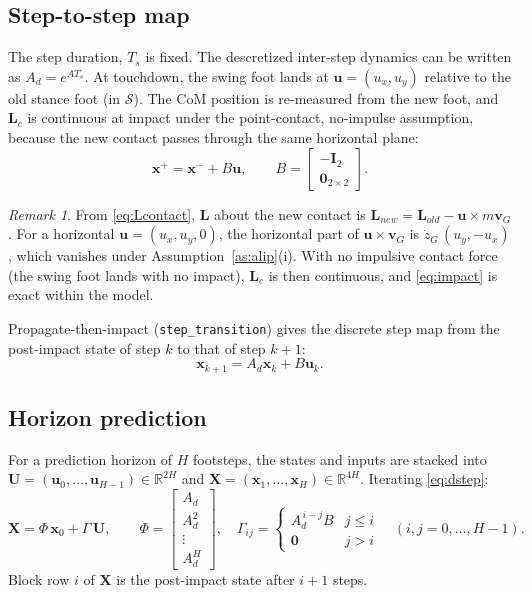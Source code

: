 \documentclass[11pt]{article}
\theoremstyle{remark}
\newtheorem{remark}{Remark}
\theoremstyle{definition}
\newcommand{\R}{\mathbb{R}}
\newcommand{\x}{\bm{x}}
\newcommand{\uu}{\bm{u}}
\newcommand{\bU}{\bm{U}}
\newcommand{\I}{\bm{I}}
\newcommand{\zero}{\bm{0}}
\newcommand{\code}[1]{\texttt{#1}}
\begin{document}
\subsection{Step-to-step map}
The step duration, $T_s$ is fixed. The descretized inter-step dynamics can be written as $A_d=e^{AT_s}$.
At touchdown, the swing foot lands at $\uu=(u_x,u_y)$ relative to the old stance foot (in $\mathcal S$).
The CoM position is re-measured from the new foot, and $\bm L_c$ is continuous at impact
under the point-contact, no-impulse assumption, because the new contact passes through the
same horizontal plane:
\begin{equation}
  \x^+=\x^-+B\uu,\qquad B=\begin{bmatrix}-\I_2\\ \zero_{2\times2}\end{bmatrix}.
  \label{eq:impact}
\end{equation}
\begin{remark}
From \eqref{eq:Lcontact}, $\bm L$ about the new contact is $\bm L_{new}=\bm L_{old}-\bm u\times m\bm v_G$. For a horizontal
$\bm u=(u_x,u_y,0)$, the horizontal part of $\bm u\times\bm v_G$ is $\dot z_G\,(u_y,-u_x)$, which vanishes under
Assumption~\ref{as:alip}(i). With no impulsive contact force (the swing foot lands with no impact), $\bm L_c$ is
then continuous, and \eqref{eq:impact} is exact within the model.
\end{remark}
Propagate-then-impact (\code{step\_transition}) gives the discrete step map from the
post-impact state of step $k$ to that of step $k+1$:
\begin{equation}
  \x_{k+1}=A_d\x_k+B\uu_k.
  \label{eq:dstep}
\end{equation}

\subsection{Horizon prediction}
For a prediction horizon of $H$ footsteps, the states and inputs are stacked into 
$\bU=(\uu_0,\dots,\uu_{H-1})\in\R^{2H}$ and $\bm X=(\x_1,\dots,\x_H)\in\R^{4H}$. Iterating
\eqref{eq:dstep}:
\begin{equation}
  \bm X=\Phi\,\x_0+\Gamma\,\bU,\qquad
  \Phi=\begin{bmatrix}A_d\\A_d^2\\ \vdots\\ A_d^H\end{bmatrix},\quad
  \Gamma_{ij}=\begin{cases}A_d^{\,i-j}B & j\le i\\ \zero & j>i\end{cases}
  \quad(i,j=0,\dots,H-1).
  \label{eq:stack}
\end{equation}
Block row $i$ of $\bm X$ is the post-impact state after $i+1$ steps.
\end{document}
